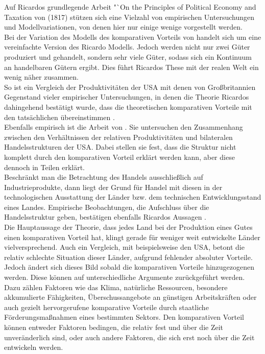 %
Auf Ricardos grundlegende Arbeit "`On the Principles of Political Economy and Taxation{\dq} von  (1817) stützen sich eine Vielzahl von empirischen Untersuchungen und Modellvariationen, von denen hier nur einige wenige vorgestellt werden.\\
%
Bei der Variation des Modells des komparativen Vorteils von \cite{Dornbusch.1977} handelt sich um eine vereinfachte Version des Ricardo Modells. Jedoch werden nicht nur zwei Güter produziert und gehandelt, sondern sehr viele Güter, sodass sich ein Kontinuum an handelbaren Gütern ergibt. Dies führt Ricardos These mit der realen Welt ein wenig näher zusammen.\\
%
So ist ein Vergleich der Produktivitäten der USA mit denen von Großbritannien Gegenstand vieler empirischer Untersuchungen, in denen die Theorie Ricardos dahingehend bestätigt wurde, dass die theoretischen komparativen Vorteile mit den tatsächlichen übereinstimmen \cite{MacDougall.1952,Stern.1962,Balassa.1963}.\\
%
Ebenfalls empirisch ist die Arbeit von \cite{Golub.2000}. Sie untersuchen den Zusammenhang zwischen den Verhältnissen der relativen Produktivitäten und bilateralen Handelsstrukturen der USA. Dabei stellen sie fest, dass die Struktur nicht komplett durch den komparativen Vorteil erklärt werden kann, aber diese dennoch in Teilen erklärt.\\
%
Beschränkt man die Betrachtung des Handels ausschließlich auf Industrieprodukte, dann liegt der Grund für Handel mit diesen in der technologischen Ausstattung der Länder bzw. dem technischen Entwicklungsstand eines Landes. Empirische Beobachtungen, die Aufschluss über die Handelsstruktur geben, bestätigen ebenfalls Ricardos Aussagen \cite{Dosi.1988}.\\
%
Die Hauptaussage der Theorie, dass jedes Land bei der Produktion eines Gutes einen komparativen Vorteil hat, klingt gerade für weniger weit entwickelte Länder vielversprechend. Auch ein Vergleich, mit beispielsweise den USA, betont die relativ schlechte Situation dieser Länder, aufgrund fehlender absoluter Vorteile. Jedoch ändert sich dieses Bild sobald die komparativen Vorteile hinzugezogenen werden. Diese können auf unterschiedliche Argumente zurückgeführt werden. Dazu zählen Faktoren wie das Klima, natürliche Ressourcen, besondere akkumulierte Fähigkeiten, Überschussangebote an günstigen Arbeitskräften oder auch gezielt hervorgerufene komparative Vorteile durch staatliche Förderungsmaßnahmen eines bestimmten Sektors. Den komparativen Vorteil können entweder Faktoren bedingen, die relativ fest und über die Zeit unveränderlich sind, oder auch andere Faktoren, die sich erst noch über die Zeit entwickeln werden.\\
